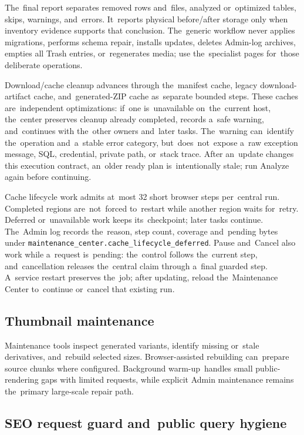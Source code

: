 \documentclass[11pt,a4paper]{article}
\newcommand{\codeword}[1]{\nolinkurl{#1}}
\begin{document}
The~final report separates removed rows and~files, analyzed or~optimized tables,
skips, warnings, and~errors. It~reports physical before/after storage only when
inventory evidence supports that conclusion. The~generic workflow never applies
migrations, performs schema repair, installs updates, deletes Admin-log
archives, empties all Trash entries, or~regenerates media; use the~specialist
pages for~those deliberate operations.

Download/cache cleanup advances through the~manifest cache, legacy
download-artifact cache, and~generated-ZIP cache as~separate bounded steps.
These caches are~independent optimizations: if~one is~unavailable on~the~current
host, the~center preserves cleanup already completed, records a~safe warning,
and~continues with the~other owners and~later tasks. The~warning can~identify
the~operation and~a~stable error category, but~does~not~expose a~raw exception
message, SQL, credential, private path, or~stack trace. After an~update changes
this execution contract, an~older ready plan is~intentionally stale; run Analyze
again before continuing.

Cache lifecycle work admits at~most 32 short browser steps per~central run.
Completed regions are~not~forced to~restart while another region waits
for~retry.
Deferred or~unavailable work keeps its~checkpoint; later tasks continue.
The~Admin log records the~reason, step count, coverage and~pending bytes under
\codeword{maintenance\_center.cache\_lifecycle\_deferred}.
Pause and~Cancel also work while a~request is~pending: the~control follows
the~current step, and~cancellation releases the~central claim through a~final
guarded step. A~service restart preserves the~job; after updating, reload
the~Maintenance Center to~continue or~cancel that existing run.

\subsection{Thumbnail maintenance}

Maintenance tools inspect generated variants, identify missing or~stale
derivatives, and~rebuild selected sizes. Browser-assisted rebuilding can~prepare
source chunks where configured. Background warm-up~handles small
public-rendering gaps with limited requests, while explicit Admin maintenance
remains the~primary large-scale repair path.

\subsection{SEO request guard and~public query hygiene}
\end{document}
